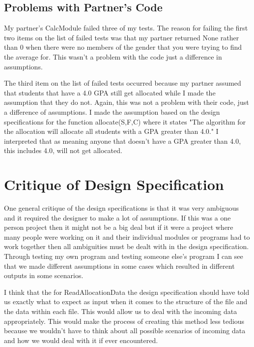\documentclass[12pt]{article}
\begin{document}
\subsection{Problems with Partner's Code}

My partner's CalcModule failed three of my tests. The reason for failing the first two items on the list of failed tests was that 
my partner returned None rather than 0 when there were no members of the gender that you were trying to find the average for. This wasn't 
a problem with the code just a difference in assumptions.

The third item on the list of failed tests occurred because my partner assumed that students that have a 4.0 GPA still get allocated while I
made the assumption that they do not. Again, this was not a problem with their code, just a difference of assumptions. I made the assumption 
based on the design specifications for the function allocate(S,F,C) where it states "The algorithm for the allocation will allocate all 
students with a GPA greater than 4.0." I interpreted that as meaning anyone that doesn't have a GPA greater than 4.0, this includes 4.0, will
not get allocated.

\section{Critique of Design Specification}

One general critique of the design specifications is that it was very ambiguous and it required the designer to make a lot of assumptions. 
If this was a one person project then it might not be a big deal but if it were a project where many people were working on it and their 
individual modules or programs had to work together then all ambiguities must be dealt with in the design specification. Through testing my
own program and testing someone else's program I can see that we made different assumptions in some cases which resulted in different outputs
in some scenarios. 

I think that the for ReadAllocationData the design specification should have told us exactly what to expect as input when it comes to the
structure of the file and the data within each file. This would allow us to deal with the incoming data appropriately. This would make the 
process of creating this method less tedious because we wouldn't have to think about all possible scenarios of incoming data and how we would
deal with it if ever encountered. 
\end{document}
